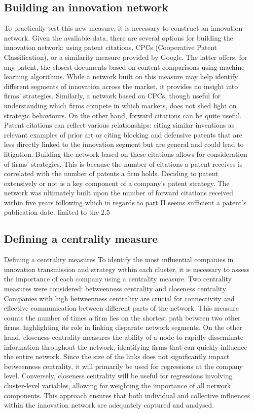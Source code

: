 \documentclass[12pt]{article}
\begin{document}
\subsection{Building an innovation network}
To practically test this new measure, it is necessary to construct an innovation network. Given the available data, there are several options for building the innovation network: using patent citations, CPCs (Cooperative Patent Classification), or a similarity measure provided by Google.
The latter offers, for any patent, the closest documents based on content comparisons using machine learning algorithms. While a network built on this measure may help identify different segments of innovation across the market, it provides no insight into firms' strategies. Similarly, a network based on CPCs, though useful for understanding which firms compete in which markets, does not shed light on strategic behaviours.
On the other hand, forward citations can be quite useful. Patent citations can reflect various relationships: citing similar inventions as relevant examples of prior art or citing blocking and defensive patents that are less directly linked to the innovation segment but are general and could lead to litigation. Building the network based on these citations allows for consideration of firms' strategies. This is because the number of citations a patent receives is correlated with the number of patents a firm holds. Deciding to patent extensively or not is a key component of a company's patent strategy.
The network was ultimately built upon the number of forward citations received within five years following which in regards to part II seems sufficient a patent's publication date, limited to the 2.5%

\subsection*{Defining a centrality measure}
Defining a centrality measures 
To identify the most influential companies in innovation transmission and strategy within each cluster, it is necessary to assess the importance of each company using a centrality measure. Two centrality measures were considered: betweenness centrality and closeness centrality.
Companies with high betweenness centrality are crucial for connectivity and effective communication between different parts of the network. This measure counts the number of times a firm lies on the shortest path between two other firms, highlighting its role in linking disparate network segments. On the other hand, closeness centrality measures the ability of a node to rapidly disseminate information throughout the network, identifying firms that can quickly influence the entire network.
Since the size of the links does not significantly impact betweenness centrality, it will primarily be used for regressions at the company level. Conversely, closeness centrality will be useful for regressions involving cluster-level variables, allowing for weighting the importance of all network components. This approach ensures that both individual and collective influences within the innovation network are adequately captured and analysed.
\end{document}
